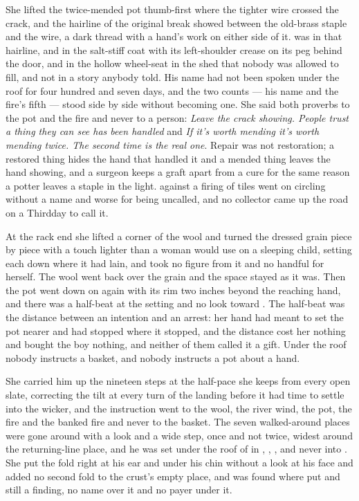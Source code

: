 She lifted the twice-mended pot thumb-first where the tighter wire crossed the crack, and the hairline of the original break showed between the old-brass staple and the wire, a dark thread with a hand's work on either side of it.  was in that hairline, and in the salt-stiff coat with its left-shoulder crease on its peg behind the door, and in the hollow wheel-seat in the shed that nobody was allowed to fill, and not in a story anybody told. His name had not been spoken under the roof for four hundred and seven days, and the two counts --- his name and the fire's fifth --- stood side by side without becoming one. She said both proverbs to the pot and the fire and never to a person: \emph{Leave the crack showing. People trust a thing they can see has been handled} and \emph{If it's worth mending it's worth mending twice. The second time is the real one}. Repair was not restoration; a restored thing hides the hand that handled it and a mended thing leaves the hand showing, and a surgeon keeps a graft apart from a cure for the same reason a potter leaves a staple in the light.  against a firing of tiles went on circling without a name and worse for being uncalled, and no collector came up the road on a Thirdday to call it.

At the rack end she lifted a corner of the wool and turned the dressed grain piece by piece with a touch lighter than a woman would use on a sleeping child, setting each down where it had lain, and took no figure from it and no handful for herself. The wool went back over the grain and the space stayed as it was. Then the pot went down on  again with its rim two inches beyond the reaching hand, and there was a half-beat at the setting and no look toward . The half-beat was the distance between an intention and an arrest: her hand had meant to set the pot nearer and had stopped where it stopped, and the distance cost her nothing and bought the boy nothing, and neither of them called it a gift. Under the roof nobody instructs a basket, and nobody instructs a pot about a hand.

She carried him up the nineteen steps at the half-pace she keeps from every open slate, correcting the tilt at every turn of the landing before it had time to settle into the wicker, and the instruction went to the wool, the river wind, the pot, the fire and the banked fire and never to the basket. The seven walked-around places were gone around with a look and a wide step, once and not twice, widest around the returning-line place, and he was set under the roof of  in , , , and never into . She put the fold right at his ear and under his chin without a look at his face and added no second fold to the crust's empty place, and  was found where put and still a finding, no name over it and no payer under it.


